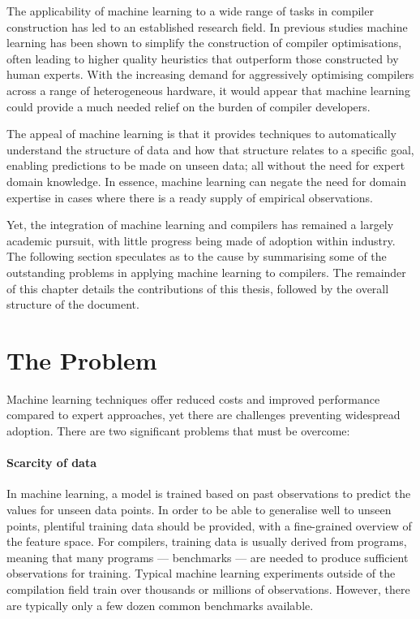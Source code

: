 The applicability of machine learning to a wide range of tasks in compiler construction has led to an established research field. In previous studies machine learning has been shown to simplify the construction of compiler optimisations, often leading to higher quality heuristics that outperform those constructed by human experts. With the increasing demand for aggressively optimising compilers across a range of heterogeneous hardware, it would appear that machine learning could provide a much needed relief on the burden of compiler developers.

The appeal of machine learning is that it provides techniques to automatically understand the structure of data and how that structure relates to a specific goal, enabling predictions to be made on unseen data; all without the need for expert domain knowledge. In essence, machine learning can negate the need for domain expertise in cases where there is a ready supply of empirical observations.

Yet, the integration of machine learning and compilers has remained a largely academic pursuit, with little progress being made of adoption within industry. The following section speculates as to the cause by summarising some of the outstanding problems in applying machine learning to compilers. The remainder of this chapter details the contributions of this thesis, followed by the overall structure of the document.


\section{The Problem}

Machine learning techniques offer reduced costs and improved performance compared to expert approaches, yet there are challenges preventing widespread adoption. There are two significant problems that must be overcome:

\paragraph*{Scarcity of data} In machine learning, a model is trained based on past observations to predict the values for unseen data points. In order to be able to generalise well to unseen points, plentiful training data should be provided, with a fine-grained overview of the feature space. For compilers, training data is usually derived from programs, meaning that many programs --- benchmarks --- are needed to produce sufficient observations for training. Typical machine learning experiments outside of the compilation field train over thousands or millions of observations. However, there are typically only a few dozen common benchmarks available.

